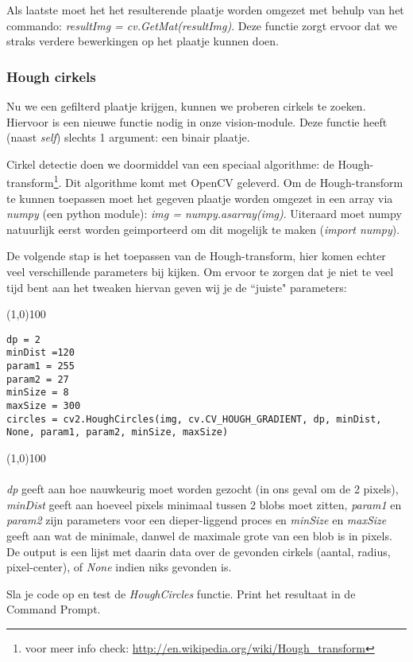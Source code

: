 \documentclass[a4paper]{article}
\begin{document}
Als laatste moet het het resulterende plaatje worden omgezet met behulp van het commando: \textit{resultImg = cv.GetMat(resultImg)}. Deze functie zorgt ervoor dat we straks verdere bewerkingen op het plaatje kunnen doen.

\subsubsection{Hough cirkels}
Nu we een gefilterd plaatje krijgen, kunnen we proberen cirkels te zoeken. Hiervoor is een nieuwe functie nodig in onze vision-module. Deze functie heeft (naast \textit{self}) slechts 1 argument: een binair plaatje.

Cirkel detectie doen we doormiddel van een speciaal algorithme: de Hough-transform\footnote{voor meer info check: \url{http://en.wikipedia.org/wiki/Hough_transform}}. Dit algorithme komt met OpenCV geleverd. Om de Hough-transform te kunnen toepassen moet het gegeven plaatje worden omgezet in een array via \textit{numpy} (een python module): \textit{img = numpy.asarray(img)}. Uiteraard moet numpy natuurlijk eerst worden geimporteerd om dit mogelijk te maken (\textit{import numpy}).

De volgende stap is het toepassen van de Hough-transform, hier komen echter veel verschillende parameters bij kijken. Om ervoor te zorgen dat je niet te veel tijd bent aan het tweaken hiervan geven wij je de ``juiste" parameters:

\noindent \line(1,0){100}
\begin{verbatim}
dp = 2
minDist =120
param1 = 255
param2 = 27
minSize = 8
maxSize = 300
circles = cv2.HoughCircles(img, cv.CV_HOUGH_GRADIENT, dp, minDist, None, param1, param2, minSize, maxSize)
\end{verbatim}
\noindent \line(1,0){100}
\\\\
\textit{dp} geeft aan hoe nauwkeurig moet worden gezocht (in ons geval om de 2 pixels), \textit{minDist} geeft aan hoeveel pixels minimaal tussen 2 blobs moet zitten, \textit{param1} en \textit{param2} zijn parameters voor een dieper-liggend proces en \textit{minSize} en \textit{maxSize} geeft aan wat de minimale, danwel de maximale grote van een blob is in pixels.
De output is een lijst met daarin data over de gevonden cirkels (aantal, radius, pixel-center), of \textit{None} indien niks gevonden is.

Sla je code op en test de \textit{HoughCircles} functie. Print het resultaat in de Command Prompt. 
\end{document}
